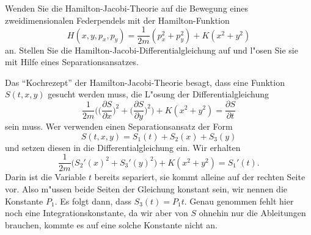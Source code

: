 Wenden Sie die Hamilton-Jacobi-Theorie auf die Bewegung eines
zweidimensionalen Federpendels mit der Hamilton-Funktion 
\[
H(x,y,p_x,p_y)=\frac1{2m}(p_x^2+p_y^2)+K(x^2 + y^2)
\]
an. Stellen Sie die Hamilton-Jacobi-Differentialgleichung auf
und l"osen Sie sie mit Hilfe eines Separationsansatzes.

\begin{loesung}
Das ``Kochrezept'' der Hamilton-Jacobi-Theorie besagt, dass eine
Funktion $S(t, x, y)$ gesucht werden muss, die L"osung
der Differentialgleichung
\[
\frac1{2m}\biggl(
\biggl(\frac{\partial S}{\partial x}\biggr)^2
+
\biggl(\frac{\partial S}{\partial y}\biggr)^2
\biggr)+K(x^2+y^2)=\frac{\partial S}{\partial t}
\]
sein muss. Wer verwenden einen Separationsansatz der Form
\[
S(t,x,y)=S_1(t)+S_2(x)+S_3(y)
\]
und setzen diesen in die Differentialgleichung ein.
Wir erhalten
\[
\frac1{2m}\bigl( S_2'(x)^2+S_3'(y)^2 \bigr)+K(x^2+y^2)=S_1'(t).
\]
Darin ist die Variable $t$ bereits separiert, sie kommt alleine auf
der rechten Seite vor. Also m"ussen beide Seiten der Gleichung konstant
sein, wir nennen die Konstante $P_1$. Es folgt dann, dass 
$S_3(t)=P_1t$.
Genau genommen fehlt hier noch eine Integrationskonstante, da wir aber
von $S$ ohnehin nur die Ableitungen brauchen, kommte es auf eine solche
Konstante nicht an.


\end{loesung}
